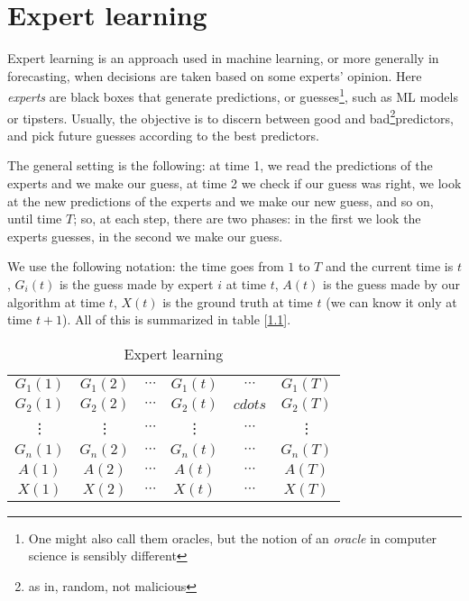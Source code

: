 \chapter{Expert learning}\label{sec:experts}

Expert learning is an approach used in machine learning, or more generally in forecasting, when decisions are taken based on some experts' opinion. Here \emph{experts} are black boxes that generate predictions, or guesses\footnote{One might also call them oracles, but the notion of an \emph{oracle} in computer science is sensibly different}, such as ML models or tipsters. Usually, the objective is to discern between good and bad\footnote{as in, random, not malicious}predictors, and pick future guesses according to the best predictors.

The general setting is the following: at time 1, we read the predictions of the experts and we make our guess, at time 2 we check if our guess was right, we look at the new predictions of the experts and we make our new guess, and so on, until time $T$; so, at each step, there are two phases: in the first we look the experts guesses, in the second we make our guess.

We use the following notation: the time goes from $1$ to $T$ and the current time is $t$, $G_i(t)$ is the guess made by expert $i$ at time $t$, $A(t)$ is the guess made by our algorithm at time $t$, $X(t)$ is the ground truth at time $t$ (we can know it only at time $t+1$). All of this is summarized in table [\ref{tab:experts}].

\begin{table}[h]
    \centering
    \begin{tabular}{|cccccc|}
        \hline
        $G_1(1)$ & $G_1(2)$ & $\cdots$ & $G_1(t)$ & $\cdots$ & $G_1(T)$ \\
        $G_2(1)$ & $G_2(2)$ & $\cdots$ & $G_2(t)$ & $cdots$ & $G_2(T)$ \\
        \vdots   & \vdots   & $\cdots$ & \vdots   & $\cdots$ & \vdots   \\
        $G_n(1)$ & $G_n(2)$ & $\cdots$ & $G_n(t)$ & $\cdots$ & $G_n(T)$ \\ \hline
        $A(1)$   & $A(2)$   & $\cdots$ & $A(t)$   & $\cdots$ & $A(T)$   \\ \hline
        $X(1)$   & $X(2)$   & $\cdots$ & $X(t)$   & $\cdots$ & $X(T)$   \\ \hline
    \end{tabular}
    \caption{Expert learning}
    \label{tab:experts}
\end{table}

